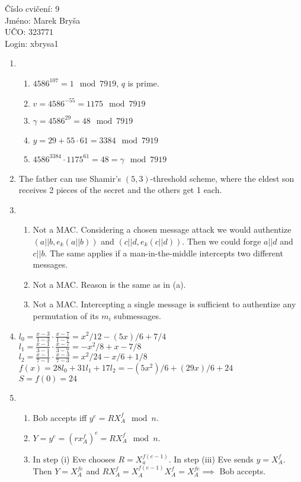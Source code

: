 \documentclass[a4paper,10pt]{extarticle}
\begin{document}
\begin{flushleft}
Číslo cvičení: 9 \\ 
Jméno: Marek Bryša \\
UČO: 323771\\
Login: xbrysa1\\
\end{flushleft}
\begin{enumerate}
  \item
    \begin{enumerate}
      \item
        $4586^{107}=1 \mod 7919$, $q$ is prime.
      \item
        $v=4586^{-55}=1175 \mod 7919$
      \item
        $\gamma=4586^{29}=48 \mod 7919$
      \item
        $y=29+55\cdot61=3384 \mod 7919$
      \item
        $4586^{3384}\cdot1175^{61}=48=\gamma \mod 7919$
    \end{enumerate}
  \item
    The father can use Shamir's $(5,3)$-threshold scheme, where the eldest son receives 2 pieces of the secret and the others get 1 each.
  \item
    \begin{enumerate}
      \item
        Not a MAC. Considering a chosen message attack we would authentize $(a||b,e_k(a||b))$ and $(c||d,e_k(c||d))$. Then we could forge $a||d$ and $c||b$. The same applies if a man-in-the-middle intercepts two different messages.
      \item
        Not a MAC. Reason is the same as in (a).
      \item
        Not a MAC. Intercepting a single message is sufficient to authentize any permutation of its $m_i$ submessages.
    \end{enumerate}
  \item
    $l_0=\frac{x-3}{1-3}\cdot\frac{x-7}{1-7}=x^2/12-(5 x)/6+7/4$\\
    $l_1=\frac{x-1}{3-1}\cdot\frac{x-7}{3-7}=-x^2/8+x-7/8$\\
    $l_2=\frac{x-1}{7-1}\cdot\frac{x-3}{7-3}=x^2/24-x/6+1/8$\\
    $f(x)=28l_0+31l_1+17l_2=-(5 x^2)/6+(29 x)/6+24$\\
    $S=f(0)=24$
  \item
    \begin{enumerate}
      \item
        Bob accepts iff $y^e=RX_A^f \mod n$.
      \item
        $Y=y^e=(rx_A^f)^e=RX_A^f \mod n$.
      \item
        In step (i) Eve chooses $R=X_a^{f(e-1)}$. In step (iii) Eve sends $y=X_A^f$. Then $Y=X_A^{fe}$ and $RX_A^f=X_A^{f(e-1)}X_A^f=X_A^{fe}\implies$ Bob accepts.
        

\end{enumerate}
\end{enumerate}
\end{document}
